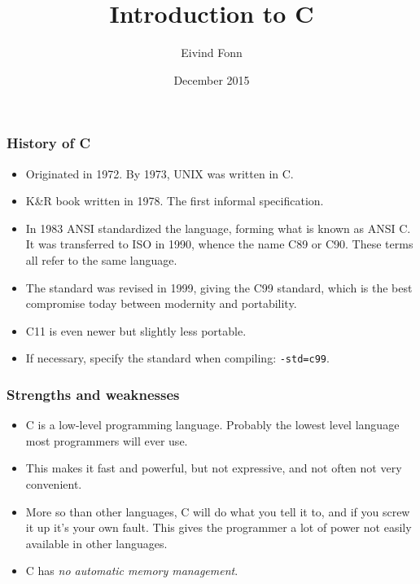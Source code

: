 

\title{Introduction to C}
\author{Eivind Fonn}
\date{December 2015}
\maketitle

\begin{frame}
  \frametitle{History of C}
  \begin{itemize}
  \item Originated in 1972. By 1973, UNIX was written in C.
  \item K\&R book written in 1978. The first informal specification.
  \item In 1983 ANSI standardized the language, forming what is known as ANSI C.
    It was transferred to ISO in 1990, whence the name C89 or C90. These terms
    all refer to the same language.
  \item The standard was revised in 1999, giving the C99 standard, which is the
    best compromise today between modernity and portability.
  \item C11 is even newer but slightly less portable.
  \item If necessary, specify the standard when compiling: \texttt{-std=c99}.
  \end{itemize}
\end{frame}

\begin{frame}
  \frametitle{Strengths and weaknesses}
  \begin{itemize}
  \item C is a low-level programming language. Probably the lowest level
    language most programmers will ever use.
  \item This makes it fast and powerful, but not expressive, and not often not
    very convenient.
  \item More so than other languages, C will do what you tell it to, and if you
    screw it up it's your own fault. This gives the programmer a lot of power
    not easily available in other languages.
  \item C has \emph{no automatic memory management}.
  \end{itemize}
\end{frame}

